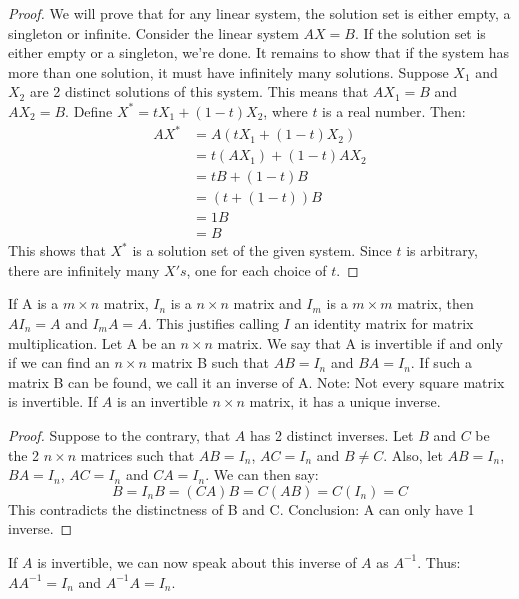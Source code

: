 \documentclass[12pt]{article}
\begin{document}
\begin{proof} We will prove that for any linear system, the solution set is either empty, a singleton or infinite. \newline
Consider the linear system $AX = B$. If the solution set is either empty or a singleton, we're done. It remains to show that if the system has more than one solution, it must have infinitely many solutions. Suppose $X_1$ and $X_2$ are 2 distinct solutions of this system. This means that $AX_1 = B$ and $AX_2 = B$. Define $X^* = tX_1 + (1 - t)X_2$, where $t$ is a real number. Then:  \begin{align*} AX^* &= A(tX_1 + (1 - t)X_2) \\ &= t(AX_1) + (1 - t)AX_2 \\ &= tB + (1 - t)B \\ &= (t + (1 - t))B \\ &= 1B \\ &= B \end{align*}  \newline This shows that $X^*$ is a solution set of the given system. Since $t$ is arbitrary, there are infinitely many $X's$, one for each choice of $t$. \end{proof}
If A is a $m \times n$ matrix, $I_n$ is a $n \times n$ matrix and $I_m$ is a $m \times m$ matrix, then $AI_n = A$ and $I_mA = A$. This justifies calling $I$ an identity matrix for matrix multiplication. \newline
Let A be an $n \times n$ matrix. We say that A is invertible if and only if we can find an $n \times n$ matrix B such that $AB = I_n$ and $BA = I_n$. If such a matrix B can be found, we call it an inverse of A. \newline
Note: Not every square matrix is invertible. \newline 
If $A$ is an invertible $n \times n$ matrix, it has a unique inverse. 
\begin{proof} 
Suppose to the contrary, that $A$ has 2 distinct inverses. Let $B$ and $C$ be the 2 $n \times n$ matrices such that $ AB = I_n$, $ AC = I_n$ and $ B \neq C$. Also, let $ AB = I_n$, $ BA = I_n$, $AC = I_n$ and $CA = I_n$. We can then say: $$ B = I_nB = (CA)B = C(AB) = C(I_n) = C$$ \newline This contradicts the distinctness of B and C. Conclusion: A can only have 1 inverse. \end{proof}
If $A$ is invertible, we can now speak about this inverse of $A$ as $A^{-1}$. Thus: $AA^{-1} = I_n$ and $A^{-1}A = I_n$. \newline
\end{document}
